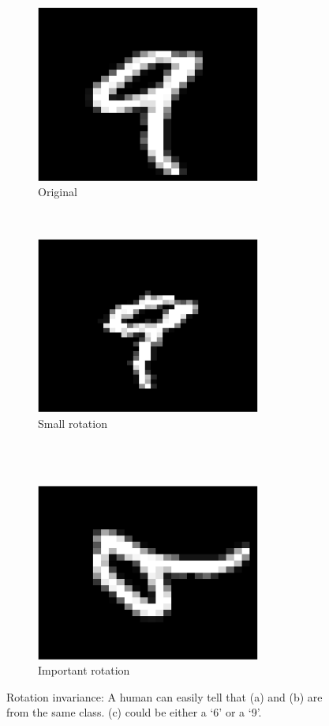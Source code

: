 \documentclass[a4paper,11pt]{report}
\begin{document}
\begin{itemize}
				\begin{figure}[h]
					\centering
					\begin{subfigure}[t]{0.48\textwidth}
						\centering
						\includegraphics[height=2.3in]{im_nine_ori.eps}
						\caption{\centering Original}
					\end{subfigure}%
					~
					\begin{subfigure}[t]{0.48\textwidth}
						\centering
						\includegraphics[height=2.3in]{im_nine_rot15.eps}
						\caption{\centering Small rotation}
					\end{subfigure}%
					\\ 
					~
					\begin{subfigure}[t]{0.48\textwidth}
						\centering
						\includegraphics[height=2.3in]{im_nine_rot90.eps}
						\caption{\centering Important rotation}
					\end{subfigure}
					
					\caption[Rotation invariance.]{\centering Rotation invariance: A human can easily tell that (a) and (b) are from the same class. (c) could be either a  `6' or a `9'.}
					\label{fig:Illustration rotation invariance}
				\end{figure}
			
			\end{itemize}
			
\end{document}
